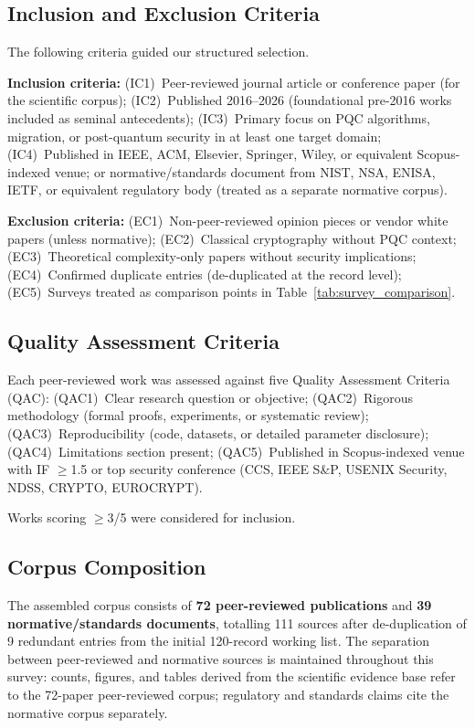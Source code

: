 \documentclass[journal]{IEEEtran}
\begin{document}
\subsection{Inclusion and Exclusion Criteria}

The following criteria guided our structured selection.

\textbf{Inclusion criteria:}
(IC1)~Peer-reviewed journal article or conference paper (for the scientific corpus);
(IC2)~Published 2016--2026 (foundational pre-2016 works included as seminal antecedents);
(IC3)~Primary focus on PQC algorithms, migration, or post-quantum security in
at least one target domain;
(IC4)~Published in IEEE, ACM, Elsevier, Springer, Wiley, or equivalent Scopus-indexed
venue; or normative/standards document from NIST, NSA, ENISA, IETF, or equivalent
regulatory body (treated as a separate normative corpus).

\textbf{Exclusion criteria:}
(EC1)~Non-peer-reviewed opinion pieces or vendor white papers (unless normative);
(EC2)~Classical cryptography without PQC context;
(EC3)~Theoretical complexity-only papers without security implications;
(EC4)~Confirmed duplicate entries (de-duplicated at the record level);
(EC5)~Surveys treated as comparison points in Table~\ref{tab:survey_comparison}.

\subsection{Quality Assessment Criteria}

Each peer-reviewed work was assessed against five Quality Assessment Criteria (QAC):
(QAC1)~Clear research question or objective;
(QAC2)~Rigorous methodology (formal proofs, experiments, or systematic review);
(QAC3)~Reproducibility (code, datasets, or detailed parameter disclosure);
(QAC4)~Limitations section present;
(QAC5)~Published in Scopus-indexed venue with IF $\geq$1.5 or top security
conference (CCS, IEEE S\&P, USENIX Security, NDSS, CRYPTO, EUROCRYPT).

Works scoring $\geq$3/5 were considered for inclusion.

\subsection{Corpus Composition}
\label{sec:corpus}

The assembled corpus consists of \textbf{72 peer-reviewed publications} and
\textbf{39 normative/standards documents}, totalling 111 sources after
de-duplication of 9 redundant entries from the initial 120-record working list.
The separation between peer-reviewed and normative sources is maintained
throughout this survey: counts, figures, and tables derived from the scientific
evidence base refer to the 72-paper peer-reviewed corpus; regulatory and
standards claims cite the normative corpus separately.
\end{document}
